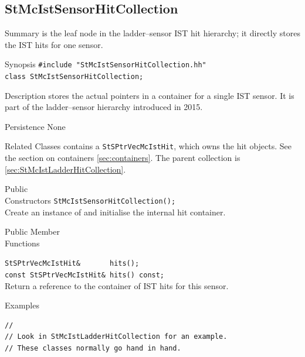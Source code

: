 \subsection{StMcIstSensorHitCollection}
 
\label{sec:StMcIstSensorHitCollection}
\begin{Entry}
\item[Summary]
     is the leaf node in the
    ladder--sensor IST hit hierarchy; it directly stores the IST hits for
    one sensor.

\item[Synopsis]
    \verb+#include "StMcIstSensorHitCollection.hh"+\\
    \verb+class StMcIstSensorHitCollection;+\\

\item[Description]
     stores the actual
     pointers in a  container
    for a single IST sensor.  It is part of the ladder--sensor hierarchy
    introduced in 2015.

\item[Persistence]
    None

\item[Related Classes]
     contains a
    {\tt StSPtrVecMcIstHit}, which owns the hit objects.  See the
    section on containers \ref{sec:containers}.
    The parent collection is
     \ref{sec:StMcIstLadderHitCollection}.

\item[Public\\ Constructors]
    \verb+StMcIstSensorHitCollection();+\\
    Create an instance of  and
    initialise the internal hit container.

\item[Public Member\\ Functions]

    \verb+StSPtrVecMcIstHit&       hits();+\\
    \verb+const StSPtrVecMcIstHit& hits() const;+\\
    Return a reference to the container of IST hits for this sensor.

\item[Examples]
{\footnotesize
\begin{verbatim}
//
// Look in StMcIstLadderHitCollection for an example.
// These classes normally go hand in hand.
\end{verbatim}
}%
\end{Entry}
\clearpage

